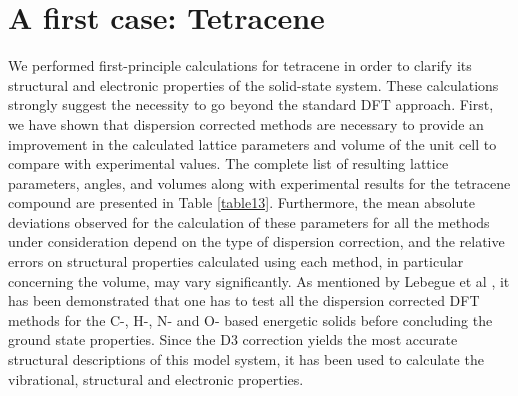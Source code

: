 \section{A first case: Tetracene}

We performed first-principle calculations for tetracene in order to clarify its structural and electronic properties of the solid-state system. These calculations strongly suggest the necessity to go beyond the standard DFT approach. First, we have shown that dispersion corrected methods are necessary to provide an improvement in the calculated lattice parameters and volume of the unit cell to compare with experimental values. The complete list of resulting lattice parameters, angles, and volumes along with experimental results for the tetracene compound are presented in Table \ref{table13}. Furthermore, the mean absolute deviations observed for the calculation of these parameters for all the methods under consideration depend on the type of dispersion correction, and the relative errors on structural properties calculated using each method, in particular concerning the volume, may vary significantly. As mentioned by Lebegue et al \cite{appalakondaiah2015dispersion}, it has been demonstrated that one has to test all the dispersion corrected DFT methods for the C-, H-, N- and O- based energetic solids before concluding the ground state properties. Since the D3 correction yields the most accurate structural descriptions of this model system, it has been used to calculate the vibrational, structural and electronic properties.\\
 
